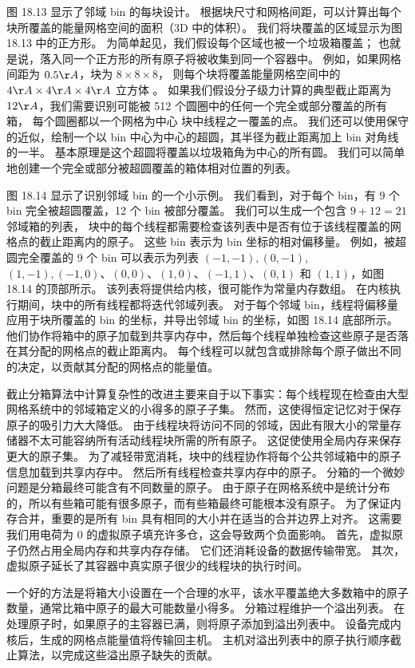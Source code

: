 图 18.13 显示了邻域 bin 的每块设计。 根据块尺寸和网格间距，可以计算出每个块所覆盖的能量网格空间的面积（3D 中的体积）。 
我们将块覆盖的区域显示为图 18.13 中的正方形。 为简单起见，我们假设每个区域也被一个垃圾箱覆盖； 
也就是说，落入同一个正方形的所有原子将被收集到同一个容器中。 
例如，如果网格间距为 $0.5 \AA$，块为 $8 \times 8 \times 8$，
则每个块将覆盖能量网格空间中的 $4 \AA \times 4 \AA \times 4 \AA$ 立方体 。 
如果我们假设分子级力计算的典型截止距离为 $12 \AA$，我们需要识别可能被 512 个圆圈中的任何一个完全或部分覆盖的所有箱，
每个圆圈都以一个网格为中心 块中线程之一覆盖的点。 
我们还可以使用保守的近似，绘制一个以 bin 中心为中心的超圆，其半径为截止距离加上 bin 对角线的一半。 
基本原理是这个超圆将覆盖以垃圾箱角为中心的所有圆。 我们可以简单地创建一个完全或部分被超圆覆盖的箱体相对位置的列表。

图 18.14 显示了识别邻域 bin 的一个小示例。 我们看到，对于每个 bin，有 9 个 bin 完全被超圆覆盖，12 个 bin 被部分覆盖。 
我们可以生成一个包含 $9+12=21$ 邻域箱的列表，
块中的每个线程都需要检查该列表中是否有位于该线程覆盖的网格点的截止距离内的原子。 
这些 bin 表示为 bin 坐标的相对偏移量。 
例如，被超圆完全覆盖的 9 个 bin 可以表示为列表 $(-1,-1),(0,-1)$, $(1,-1),(-1,0) 、(0,0)、(1,0)、(-1,1)、(0,1)$ 和 $(1,1)$，如图 18.14 的顶部所示。 
该列表将提供给内核，很可能作为常量内存数组。 
在内核执行期间，块中的所有线程都将迭代邻域列表。 
对于每个邻域 bin，线程将偏移量应用于块所覆盖的 bin 的坐标，并导出邻域 bin 的坐标，如图 18.14 底部所示。 
他们协作将箱中的原子加载到共享内存中，然后每个线程单独检查这些原子是否落在其分配的网格点的截止距离内。 
每个线程可以就包含或排除每个原子做出不同的决定，以贡献其分配的网格点的能量值。

截止分箱算法中计算复杂性的改进主要来自于以下事实：每个线程现在检查由大型网格系统中的邻域箱定义的小得多的原子子集。 
然而，这使得恒定记忆对于保存原子的吸引力大大降低。 
由于线程块将访问不同的邻域，因此有限大小的常量存储器不太可能容纳所有活动线程块所需的所有原子。 
这促使使用全局内存来保存更大的原子集。 为了减轻带宽消耗，块中的线程协作将每个公共邻域箱中的原子信息加载到共享内存中。 
然后所有线程检查共享内存中的原子。 分箱的一个微妙问题是分箱最终可能含有不同数量的原子。 
由于原子在网格系统中是统计分布的，所以有些箱可能有很多原子，而有些箱最终可能根本没有原子。 
为了保证内存合并，重要的是所有 bin 具有相同的大小并在适当的合并边界上对齐。 
这需要我们用电荷为 0 的虚拟原子填充许多仓，这会导致两个负面影响。 
首先，虚拟原子仍然占用全局内存和共享内存存储。 它们还消耗设备的数据传输带宽。 
其次，虚拟原子延长了其容器中真实原子很少的线程块的执行时间。

一个好的方法是将箱大小设置在一个合理的水平，该水平覆盖绝大多数箱中的原子数量，通常比箱中原子的最大可能数量小得多。 
分箱过程维护一个溢出列表。 在处理原子时，如果原子的主容器已满，则将原子添加到溢出列表中。 
设备完成内核后，生成的网格点能量值将传输回主机。 主机对溢出列表中的原子执行顺序截止算法，以完成这些溢出原子缺失的贡献。

